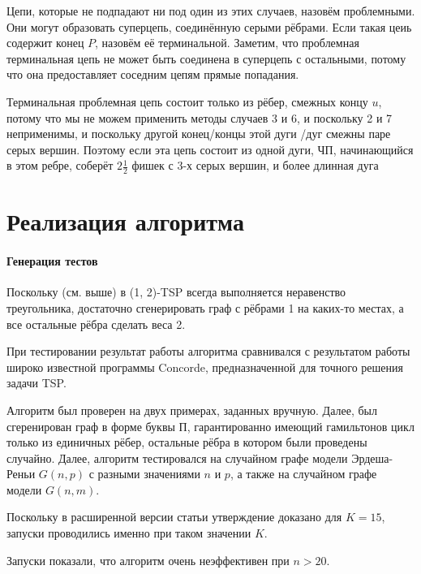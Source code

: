 Цепи, которые не подпадают ни под один из этих случаев, назовём проблемными. Они могут образовать суперцепь, соединённую серыми рёбрами. Если такая цеиь содержит конец $P$, назовём её терминальной. Заметим, что проблемная терминальная цепь не может быть соединена в суперцепь с остальными, потому что она предоставляет соседним цепям прямые попадания.

Терминальная проблемная цепь состоит только из рёбер, смежных концу $u$, потому что мы не можем применить методы случаев 3 и 6, и поскольку 2 и 7 неприменимы, и поскольку другой конец/концы этой дуги /дуг смежны паре серых вершин. Поэтому если эта цепь состоит из одной дуги, ЧП, начинающийся в этом ребре, соберёт $2\frac{1}{2}$ фишек с 3-х серых вершин, и более длинная дуга 
\section{Реализация алгоритма}
\paragraph{Генерация тестов}
Поскольку (см. выше) в (1, 2)-TSP всегда выполняется неравенство треугольника, достаточно сгенерировать граф с рёбрами 1 на каких-то местах, а все остальные рёбра сделать веса 2.

При тестировании результат работы алгоритма сравнивался с результатом работы широко известной программы Concorde, предназначенной для точного решения задачи TSP.

Алгоритм был проверен на двух примерах, заданных вручную. Далее, был сгеренирован граф в форме буквы П, гарантированно имеющий гамильтонов цикл только из единичных рёбер, остальные рёбра в котором были проведены случайно. Далее, алгоритм тестировался на случайном графе модели Эрдеша-Реньи $G(n, p)$ с разными значениями $n$ и $p$, а также на случайном графе модели $G(n, m)$.

Поскольку в расширенной версии статьи утверждение доказано для $K=15$, запуски проводились именно при таком значении $K$.

Запуски показали, что алгоритм очень неэффективен при $n>20$.


